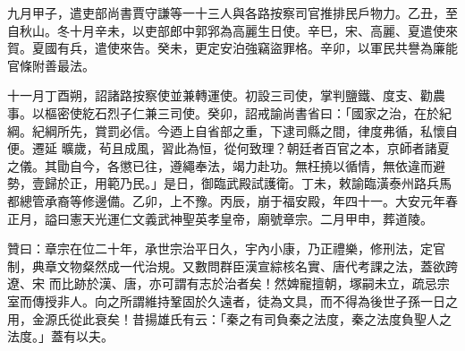 \begin{pinyinscope}
 九月甲子，遣吏部尚書賈守謙等一十三人與各路按察司官推排民戶物力。乙丑，至自秋山。冬十月辛未，以吏部郎中郭郛為高麗生日使。辛巳，宋、高麗、夏遣使來賀。夏國有兵，遣使來告。癸未，更定安泊強竊盜罪格。辛卯，以軍民共譽為廉能官條附善最法。



 十一月丁酉朔，詔諸路按察使並兼轉運使。初設三司使，掌判鹽鐵、度支、勸農事。以樞密使紇石烈子仁兼三司使。癸卯，詔戒諭尚書省曰：「國家之治，在於紀綱。紀綱所先，賞罰必信。今迺上自省部之重，下逮司縣之間，律度弗循，私懷自便。遷延
 曠歲，茍且成風，習此為恒，從何致理？朝廷者百官之本，京師者諸夏之儀。其勖自今，各懲已往，遵繩奉法，竭力赴功。無枉撓以循情，無依違而避勢，壹歸於正，用範乃民。」是日，御臨武殿試護衛。丁未，敕諭臨潢泰州路兵馬都總管承裔等修邊備。乙卯，上不豫。丙辰，崩于福安殿，年四十一。大安元年春正月，謚曰憲天光運仁文義武神聖英孝皇帝，廟號章宗。二月甲申，葬道陵。



 贊曰：章宗在位二十年，承世宗治平日久，宇內小康，乃正禮樂，修刑法，定官制，典章文物粲然成一代治規。又數問群臣漢宣綜核名實、唐代考課之法，蓋欲跨遼、宋
 而比跡於漢、唐，亦可謂有志於治者矣！然婢寵擅朝，塚嗣未立，疏忌宗室而傳授非人。向之所謂維持鞏固於久遠者，徒為文具，而不得為後世子孫一日之用，金源氏從此衰矣！昔揚雄氏有云：「秦之有司負秦之法度，秦之法度負聖人之法度。」蓋有以夫。



\end{pinyinscope}